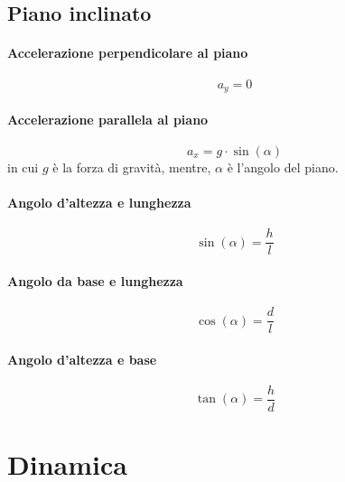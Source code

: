 \documentclass{book}
\begin{document}
\section{Piano inclinato}
\label{sec:pianoinclinato}

\begin{multicols}{2}
  \subsubsection{Accelerazione perpendicolare al piano}
  \label{sec:accperpalpiano}
  \begin{equation*}
    a_y=0
  \end{equation*}
  
  \subsubsection{Accelerazione parallela al piano}
  \label{sec:accparalpiano}
  \begin{equation*}
    a_x=g\cdot \sin(\alpha)
  \end{equation*}
  in cui $g$ è la forza di gravità, mentre, $\alpha$ è l'angolo del piano.
  
  \subsubsection{Angolo d'altezza e lunghezza}
  \label{sec:angolodaltelung}
  \begin{equation*}
    \sin(\alpha)=\frac{h}{l}
  \end{equation*}
  
  \subsubsection{Angolo da base e lunghezza}
  \label{sec:angdabaseelungh}
  \begin{equation*}
    \cos(\alpha)=\frac{d}{l}
  \end{equation*}
  
  \subsubsection{Angolo d'altezza e base}
  \label{sec:angdaltebase}
  \begin{equation*}
    \tan(\alpha)=\frac{h}{d}
  \end{equation*}
\end{multicols}
\chapter{Dinamica}
\label{chap:Dinamica}
\end{document}
